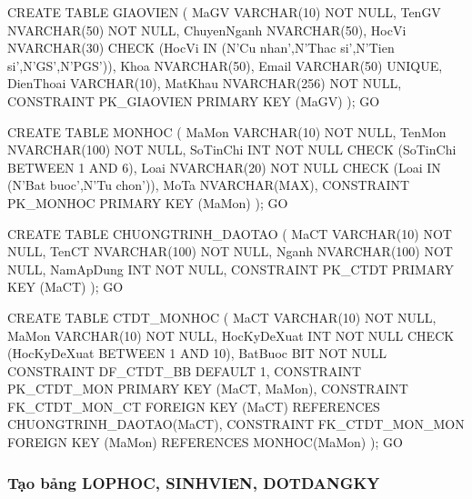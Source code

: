 \documentclass[13pt, a4paper]{article}
\begin{document}
\begin{sqlbox}
CREATE TABLE GIAOVIEN (
    MaGV        VARCHAR(10)   NOT NULL,
    TenGV       NVARCHAR(50)  NOT NULL,
    ChuyenNganh NVARCHAR(50),
    HocVi       NVARCHAR(30)  CHECK (HocVi IN
                (N'Cu nhan',N'Thac si',N'Tien si',N'GS',N'PGS')),
    Khoa        NVARCHAR(50),
    Email       VARCHAR(50)   UNIQUE,
    DienThoai   VARCHAR(10),
    MatKhau     NVARCHAR(256) NOT NULL,
    CONSTRAINT PK_GIAOVIEN PRIMARY KEY (MaGV)
);
GO

CREATE TABLE MONHOC (
    MaMon    VARCHAR(10)   NOT NULL,
    TenMon   NVARCHAR(100) NOT NULL,
    SoTinChi INT           NOT NULL CHECK (SoTinChi BETWEEN 1 AND 6),
    Loai     NVARCHAR(20)  NOT NULL CHECK (Loai IN (N'Bat buoc',N'Tu chon')),
    MoTa     NVARCHAR(MAX),
    CONSTRAINT PK_MONHOC PRIMARY KEY (MaMon)
);
GO

CREATE TABLE CHUONGTRINH_DAOTAO (
    MaCT      VARCHAR(10)   NOT NULL,
    TenCT     NVARCHAR(100) NOT NULL,
    Nganh     NVARCHAR(100) NOT NULL,
    NamApDung INT           NOT NULL,
    CONSTRAINT PK_CTDT PRIMARY KEY (MaCT)
);
GO

CREATE TABLE CTDT_MONHOC (
    MaCT        VARCHAR(10) NOT NULL,
    MaMon       VARCHAR(10) NOT NULL,
    HocKyDeXuat INT         NOT NULL CHECK (HocKyDeXuat BETWEEN 1 AND 10),
    BatBuoc     BIT         NOT NULL CONSTRAINT DF_CTDT_BB DEFAULT 1,
    CONSTRAINT PK_CTDT_MON     PRIMARY KEY (MaCT, MaMon),
    CONSTRAINT FK_CTDT_MON_CT  FOREIGN KEY (MaCT)  REFERENCES CHUONGTRINH_DAOTAO(MaCT),
    CONSTRAINT FK_CTDT_MON_MON FOREIGN KEY (MaMon) REFERENCES MONHOC(MaMon)
);
GO
\end{sqlbox}

\subsubsection{Tạo bảng LOPHOC, SINHVIEN, DOTDANGKY}
\end{document}
